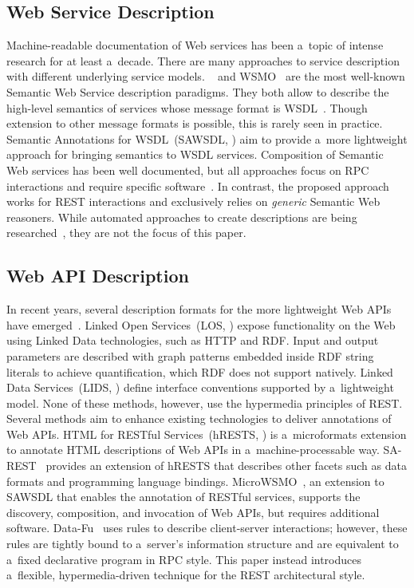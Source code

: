 \subsection{Web Service Description}
\label{subsec:WebServiceDescription}
Machine-readable documentation of Web services
has been a~topic of intense research
for at least a~decade.
There are many approaches to service description
with different underlying service models.
\owls~\cite{OWLS} and WSMO~\cite{WSMO} are the most well-known
Semantic Web Service description paradigms.
They both allow to describe the high-level semantics of services
whose message format is WSDL~\cite{WSDL}.
Though extension to other message formats is possible,
this is rarely seen in practice.
Semantic Annotations for WSDL~(SAWSDL, \cite{SAWSDL})
aim to provide a~more lightweight approach for bringing semantics to WSDL services.
Composition of Semantic Web services has been well documented,
but all approaches focus on RPC interactions and require specific software~\cite{CurrentComposition}.
In contrast, the proposed approach works for REST interactions and exclusively
relies on \emph{generic} Semantic Web reasoners.
While automated approaches to create descriptions are being researched~\cite{Leandro},
they are not the focus of this paper.

\subsection{Web API Description}
\label{subsec:WebAPIDescription}
In recent years, several description formats
for the more lightweight Web APIs have emerged~\cite{verborgh_rest_2014}.
Linked Open Services~(LOS, \cite{LOS}) expose functionality on the Web
using Linked Data technologies, such as HTTP and RDF.
Input and output parameters are described with graph patterns embedded inside RDF string literals to achieve quantification, which RDF does not support natively.
Linked Data Services~(LIDS, \cite{LIDS}) define interface conventions supported by a~lightweight model.
None of these methods, however, use the hypermedia principles of REST.
Several methods aim to enhance existing technologies
to deliver annotations of Web APIs.
HTML for RESTful Services~(hRESTS, \cite{hRESTS})
is a~microformats extension
to annotate HTML descriptions of Web APIs in a~machine-processable way.
SA-REST~\cite{SAREST} provides an extension of hRESTS
that describes other facets such as data formats and programming language bindings.
MicroWSMO~\cite{MicroWSMO,Maleshkova2009},
an extension to SAWSDL that enables the annotation of RESTful services,
supports the discovery, composition, and invocation of Web APIs,
but requires additional software.
Data-Fu~\cite{DataFu} uses rules to describe client-server interactions;
however, these rules are tightly bound to a~server's information structure
and are equivalent to a~fixed declarative program in RPC style.
This paper instead introduces a~flexible, hypermedia-driven technique
for the REST architectural style.

